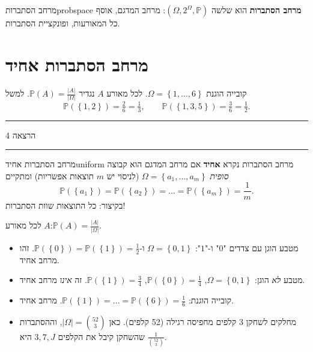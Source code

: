 \documentclass[11pt,a4paper]{report}
\newcommand{\flag}{\tikz[baseline=-0.1ex,x=0.9ex,y=0.9ex]{\draw[line width=0.5pt] (0,-0.3)--(0,1.6); \fill (0,1.6)--(1.2,1.2)--(0,0.8)--cycle;}}
\newcounter{todo}
\newcommand{\addtodo}[1]{\refstepcounter{todo}%
  \addcontentsline{tdo}{todo}{\protect\numberline{\thetodo}#1}}
\newcommand{\needcheck}[1]{\addtodo{#1}%
  {\color{todoc}\sffamily\small\,[\textbf{\flag{}\,\thetodo\ לבדיקה:} #1]\,}}
\renewcommand{\needcheck}[1]{}
\newcommand{\set}[1]{\left\{#1\right\}}
\newcommand{\PP}{\mathbb{P}}
\newcommand{\lecture}[1]{\par\medskip
  \begin{center}\color{exc}\sffamily\small
  \rule[0.5ex]{0.25\linewidth}{0.4pt}\quad הרצאה #1\quad\rule[0.5ex]{0.25\linewidth}{0.4pt}
  \end{center}\par}
\begin{document}
\begin{definition}{מרחב הסתברות}{probspace}
\textbf{מרחב הסתברות} הוא שלשה $(\Omega,2^\Omega,\PP)$: מרחב המדגם, אוסף כל המאורעות, ופונקציית הסתברות.
\end{definition}

\section{מרחב הסתברות אחיד}

\begin{example}{קובייה הוגנת}{}
$\Omega=\set{1,\dots,6}$. לכל מאורע $A$ נגדיר $\PP(A)=\frac{|A|}{|\Omega|}$. למשל
\[
  \PP(\set{1,2})=\tfrac26=\tfrac13,\qquad \PP(\set{1,3,5})=\tfrac36=\tfrac12.
\]
\needcheck{ברשימות נכתב $\PP(\set{1,2})=\frac26=\frac12$ ו-$\PP(\set{1,3,5})=\frac36=\frac13$; תיקנתי את הצמצום}
\end{example}

\lecture{4}
\needcheck{גבול ההרצאות 3 ו-4 אינו מסומן בקובץ \LR{\texttt{003\_004}}. ניחשתי שהרצאה 4 מתחילה כאן (עמוד 6 בקובץ)}

\begin{definition}{מרחב הסתברות אחיד}{uniform}
מרחב הסתברות נקרא \textbf{אחיד} אם מרחב המדגם הוא קבוצה \emph{סופית} $\Omega=\set{a_1,\dots,a_m}$ (לניסוי יש $m$ תוצאות אפשריות) ומתקיים
\[
  \PP(\set{a_1})=\PP(\set{a_2})=\dots=\PP(\set{a_m})=\frac1m.
\]
בקיצור: כל התוצאות שוות הסתברות!
\end{definition}

\begin{keybox}[title={במרחב הסתברות אחיד}]
לכל מאורע $A$:\qquad $\displaystyle \PP(A)=\frac{|A|}{|\Omega|}$.
\end{keybox}

\begin{example}{}{}
\begin{itemize}
  \item מטבע הוגן עם צדדים "$0$" ו-"$1$": $\Omega=\set{0,1}$ ו-$\PP(\set0)=\PP(\set1)=\frac12$. זהו מרחב אחיד.
  \item מטבע \emph{לא} הוגן: $\Omega=\set{0,1}$, $\PP(\set0)=\frac14$, $\PP(\set1)=\frac34$. זה \emph{אינו} מרחב אחיד.
  \item קובייה הוגנת: $\PP(\set1)=\dots=\PP(\set6)=\frac16$. מרחב אחיד.
  \item מחלקים לשחקן 3 קלפים מחפיסה רגילה (52 קלפים). כאן $|\Omega|=\binom{52}{3}$, וההסתברות שהשחקן קיבל את הקלפים $3,7,J$ היא $\frac{1}{\binom{52}{3}}$.
  \needcheck{כדי שהתשובה $1/\binom{52}{3}$ תהיה נכונה צריך שמדובר בשלושה קלפים מסוימים (כולל הצורה), למשל $3\heartsuit,7\heartsuit,J\heartsuit$. לבדוק מה נאמר בהרצאה}
\end{itemize}
\end{example}
\end{document}
